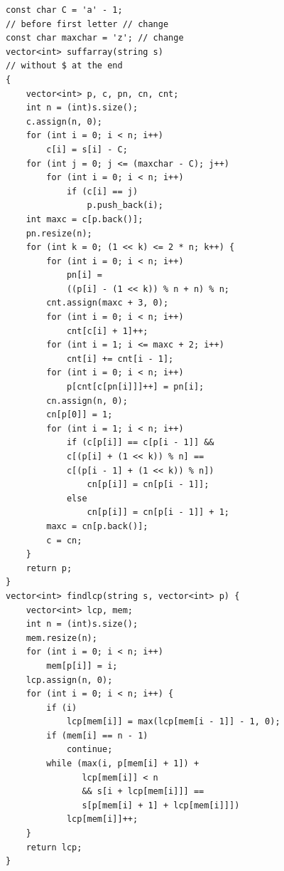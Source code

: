 \documentclass[10pt, portrait,letterpaper]{article}
\begin{document}
\begin{verbatim}
const char C = 'a' - 1; 
// before first letter // change
const char maxchar = 'z'; // change
vector<int> suffarray(string s) 
// without $ at the end
{
    vector<int> p, c, pn, cn, cnt;
    int n = (int)s.size();
    c.assign(n, 0);
    for (int i = 0; i < n; i++)
        c[i] = s[i] - C;
    for (int j = 0; j <= (maxchar - C); j++)
        for (int i = 0; i < n; i++)
            if (c[i] == j)
                p.push_back(i);
    int maxc = c[p.back()];
    pn.resize(n);
    for (int k = 0; (1 << k) <= 2 * n; k++) {
        for (int i = 0; i < n; i++)
            pn[i] = 
            ((p[i] - (1 << k)) % n + n) % n;
        cnt.assign(maxc + 3, 0);
        for (int i = 0; i < n; i++)
            cnt[c[i] + 1]++;
        for (int i = 1; i <= maxc + 2; i++)
            cnt[i] += cnt[i - 1];
        for (int i = 0; i < n; i++)
            p[cnt[c[pn[i]]]++] = pn[i];
        cn.assign(n, 0);
        cn[p[0]] = 1;
        for (int i = 1; i < n; i++)
            if (c[p[i]] == c[p[i - 1]] && 
            c[(p[i] + (1 << k)) % n] == 
            c[(p[i - 1] + (1 << k)) % n])
                cn[p[i]] = cn[p[i - 1]];
            else
                cn[p[i]] = cn[p[i - 1]] + 1;
        maxc = cn[p.back()];
        c = cn;
    }
    return p;
}
vector<int> findlcp(string s, vector<int> p) {
    vector<int> lcp, mem;
    int n = (int)s.size();
    mem.resize(n);
    for (int i = 0; i < n; i++)
        mem[p[i]] = i;
    lcp.assign(n, 0);
    for (int i = 0; i < n; i++) {
        if (i)
            lcp[mem[i]] = max(lcp[mem[i - 1]] - 1, 0);
        if (mem[i] == n - 1)
            continue;
        while (max(i, p[mem[i] + 1]) + 
               lcp[mem[i]] < n 
               && s[i + lcp[mem[i]]] == 
               s[p[mem[i] + 1] + lcp[mem[i]]])
            lcp[mem[i]]++;
    }
    return lcp;
}
\end{verbatim}
\end{document}
